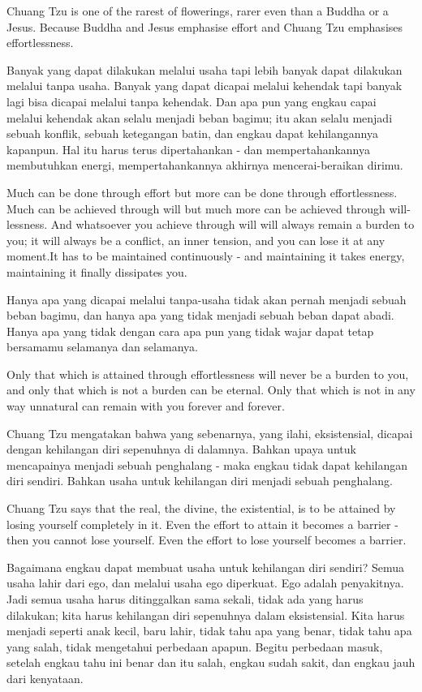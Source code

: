 \english
Chuang Tzu is one of the rarest of flowerings, rarer even than a Buddha or a Jesus. Because Buddha and Jesus emphasise effort and Chuang Tzu emphasises effortlessness.

\bahasa
Banyak yang dapat dilakukan melalui usaha tapi lebih banyak dapat dilakukan melalui tanpa usaha. Banyak yang dapat dicapai melalui kehendak tapi banyak lagi bisa dicapai melalui tanpa kehendak. Dan apa pun yang engkau capai melalui kehendak akan selalu menjadi beban bagimu; itu akan selalu menjadi sebuah konflik, sebuah ketegangan batin, dan engkau dapat kehilangannya kapanpun. Hal itu harus terus dipertahankan - dan mempertahankannya membutuhkan energi, mempertahankannya akhirnya mencerai-beraikan dirimu.

\english
Much can be done through effort but more can be done through effortlessness. Much can be achieved through will but much more can be achieved through will-lessness. And whatsoever you achieve through will will always remain a burden to you; it will always be a conflict, an inner tension, and you can lose it at any moment.It has to be maintained continuously - and maintaining it takes energy, maintaining it finally dissipates you.

\bahasa
Hanya apa yang dicapai melalui tanpa-usaha tidak akan pernah menjadi sebuah beban bagimu, dan hanya apa yang tidak menjadi sebuah beban dapat abadi. Hanya apa yang tidak dengan cara apa pun yang tidak wajar dapat tetap bersamamu selamanya dan selamanya.

\english
Only that which is attained through effortlessness will never be a burden to you, and only that which is not a burden can be eternal. Only that which is not in any way unnatural can remain with you forever and forever.

\bahasa
Chuang Tzu mengatakan bahwa yang sebenarnya, yang ilahi, eksistensial, dicapai dengan kehilangan diri sepenuhnya di dalamnya. Bahkan upaya untuk mencapainya menjadi sebuah penghalang - maka engkau tidak dapat kehilangan diri sendiri. Bahkan usaha untuk kehilangan diri menjadi sebuah penghalang.

\english
Chuang Tzu says that the real, the divine, the existential, is to be attained by losing yourself completely in it. Even the effort to attain it becomes a barrier - then you cannot lose yourself. Even the effort to lose yourself becomes a barrier.

\bahasa
Bagaimana engkau dapat membuat usaha untuk kehilangan diri sendiri? Semua usaha lahir dari ego, dan melalui usaha ego diperkuat. Ego adalah penyakitnya. Jadi semua usaha harus ditinggalkan sama sekali, tidak ada yang harus dilakukan; kita harus kehilangan diri sepenuhnya dalam eksistensial. Kita harus menjadi seperti anak kecil, baru lahir, tidak tahu apa yang benar, tidak tahu apa yang salah, tidak mengetahui perbedaan apapun. Begitu perbedaan masuk, setelah engkau tahu ini benar dan itu salah, engkau sudah sakit, dan engkau jauh dari kenyataan.

